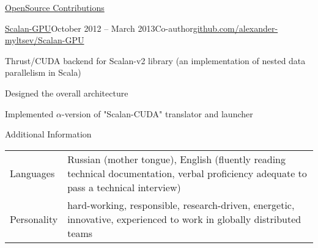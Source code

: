 \documentclass{resume} %
\begin{document}
\begin{rSection}{\href{https://github.com/alexander-myltsev?tab=repositories}{OpenSource Contributions}}
\begin{samepage}
\begin{rSubsection}{\href{http://github.com/alexander-myltsev/Scalan-GPU}{Scalan-GPU}}{October 2012 -- March 2013}{Co-author}{\href{http://github.com/alexander-myltsev/Scalan-GPU}{github.com/alexander-myltsev/Scalan-GPU}}
\item Thrust/CUDA backend for Scalan-v2 library (an implementation of nested data parallelism in Scala)
\item Designed the overall architecture 
\item Implemented $\alpha$-version of "Scalan-CUDA" translator and launcher
\end{rSubsection}
\end{samepage}

\begin{comment}
\begin{samepage}
\begin{rSubsectionEmpty}{\href{http://github.com/aspnet/Mvc}{ASP.NET MVC4}}{September 2012 -- November 2012}{Contributor}{\href{http://github.com/aspnet/Mvc}{github.com/aspnet/Mvc}}
\end{rSubsectionEmpty}
\end{samepage}
\end{comment}

\end{rSection}


\begin{rSection}{Additional Information}

\begin{table}[h]
\begin{tabularx}{\textwidth}{l X}
Languages & Russian (mother tongue), English (fluently reading technical documentation, verbal proficiency adequate to pass a technical interview) \\
Personality & hard-working, responsible, research-driven, energetic, innovative, experienced to work in globally distributed teams
\end{tabularx}
\end{table}

\end{rSection}

\end{document}
